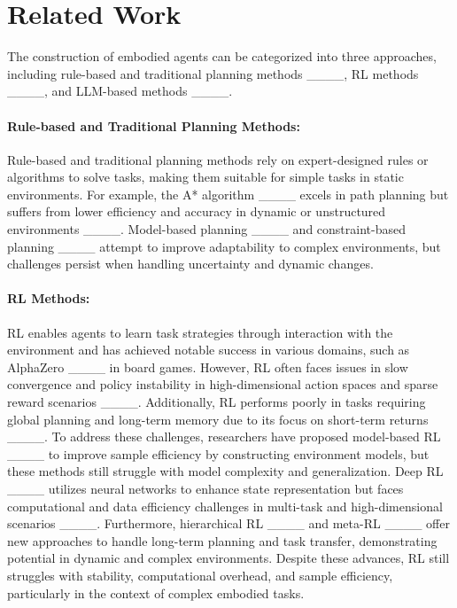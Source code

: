 \section{Related Work}
\label{sec:relate_work} The construction of embodied agents can be categorized into three approaches, including rule-based and traditional planning methods ____, RL methods ____, and LLM-based methods ____. 
\vspace{-1em}
\paragraph{Rule-based and Traditional Planning Methods:} Rule-based and traditional planning methods rely on expert-designed rules or algorithms to solve tasks, making them suitable for simple tasks in static environments. For example, the A* algorithm ____ excels in path planning but suffers from lower efficiency and accuracy in dynamic or unstructured environments ____. Model-based planning ____ and constraint-based planning ____ attempt to improve adaptability to complex environments, but challenges persist when handling uncertainty and dynamic changes.
\vspace{-1em}
\paragraph{RL Methods:} RL enables agents to learn task strategies through interaction with the environment and has achieved notable success in various domains, such as AlphaZero ____ in board games. However, RL often faces issues in slow convergence and policy instability in high-dimensional action spaces and sparse reward scenarios ____. Additionally, RL performs poorly in tasks requiring global planning and long-term memory due to its focus on short-term returns ____. To address these challenges, researchers have proposed model-based RL ____ to improve sample efficiency by constructing environment models, but these methods still struggle with model complexity and generalization. Deep RL ____ utilizes neural networks to enhance state representation but faces computational and data efficiency challenges in multi-task and high-dimensional scenarios ____. Furthermore, hierarchical RL ____ and meta-RL ____ offer new approaches to handle long-term planning and task transfer, demonstrating potential in dynamic and complex environments. Despite these advances, RL still struggles with stability, computational overhead, and sample efficiency, particularly in the context of complex embodied tasks.
\vspace{-1em}
